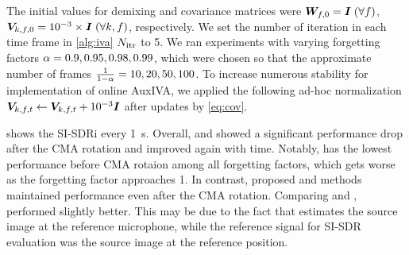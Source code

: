 \documentclass[sip,biber]{now-journal}
\begin{document}
The initial values for demixing and covariance matrices were
$\bm{W} _{f,0} = \bm{I}\; (\forall f)$, $\bm{V} _{k,f,0} = 10^{-3}\times\bm{I}\; (\forall k, f)$, respectively.
We set the number of iteration in each time frame in \cref{alg:iva} $N _{\mathrm{itr}}$ to 5.
We ran experiments with varying forgetting factors $\alpha = 0.9, 0.95, 0.98, 0.99$, which were chosen so that the approximate number of frames $\frac{1}{1 - \alpha} = 10, 20, 50, 100$.
To increase numerous stability for implementation of online AuxIVA,
we applied the following ad-hoc normalization $\cov _{\src,\ft} \gets \cov _{\src,\ft} + 10 ^{-3} \Eye$ after updates by \eqref{eq:cov}.

 shows the SI-SDRi every \SI{1}{\second}.
Overall, \NaiveIVA{} and \ResetIVA{} showed a significant performance drop after the CMA rotation and improved again with time.
Notably, \ResetIVA{} has the lowest performance before CMA rotaion among all forgetting factors, which gets worse as the forgetting factor approaches 1.
In contrast, proposed \SFIIVAm{} and \SFIIVAo{} methods maintained performance even after the CMA rotation.
Comparing \SFIIVAm{} and \SFIIVAo{}, \SFIIVAm{} performed slightly better.
This may be due to the fact that \SFIIVAo{} estimates the source image at the reference microphone, while the reference signal for SI-SDR evaluation was the source image at the reference position.
\end{document}
